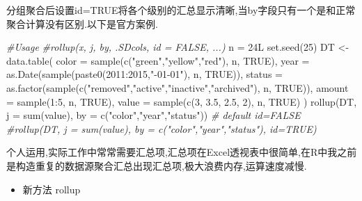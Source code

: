 \documentclass[
]{book}
\newenvironment{Shaded}{\begin{snugshade}}{\end{snugshade}}
\newcommand{\AttributeTok}[1]{\textcolor[rgb]{0.77,0.63,0.00}{#1}}
\newcommand{\CommentTok}[1]{\textcolor[rgb]{0.56,0.35,0.01}{\textit{#1}}}
\newcommand{\ConstantTok}[1]{\textcolor[rgb]{0.00,0.00,0.00}{#1}}
\newcommand{\DecValTok}[1]{\textcolor[rgb]{0.00,0.00,0.81}{#1}}
\newcommand{\FloatTok}[1]{\textcolor[rgb]{0.00,0.00,0.81}{#1}}
\newcommand{\FunctionTok}[1]{\textcolor[rgb]{0.00,0.00,0.00}{#1}}
\newcommand{\NormalTok}[1]{#1}
\newcommand{\OtherTok}[1]{\textcolor[rgb]{0.56,0.35,0.01}{#1}}
\newcommand{\SpecialCharTok}[1]{\textcolor[rgb]{0.00,0.00,0.00}{#1}}
\newcommand{\StringTok}[1]{\textcolor[rgb]{0.31,0.60,0.02}{#1}}
\providecommand{\tightlist}{%
  \setlength{\itemsep}{0pt}\setlength{\parskip}{0pt}}
\begin{document}
分组聚合后设置id=TRUE将各个级别的汇总显示清晰,当by字段只有一个是和正常聚合计算没有区别.以下是官方案例.

\begin{Shaded}
\begin{Highlighting}[]
\CommentTok{\#Usage}
\CommentTok{\#rollup(x, j, by, .SDcols, id = FALSE, ...)}
\NormalTok{n }\OtherTok{=}\NormalTok{ 24L}
\FunctionTok{set.seed}\NormalTok{(}\DecValTok{25}\NormalTok{)}
\NormalTok{DT }\OtherTok{\textless{}{-}} \FunctionTok{data.table}\NormalTok{(}
    \AttributeTok{color =} \FunctionTok{sample}\NormalTok{(}\FunctionTok{c}\NormalTok{(}\StringTok{"green"}\NormalTok{,}\StringTok{"yellow"}\NormalTok{,}\StringTok{"red"}\NormalTok{), n, }\ConstantTok{TRUE}\NormalTok{),}
    \AttributeTok{year =} \FunctionTok{as.Date}\NormalTok{(}\FunctionTok{sample}\NormalTok{(}\FunctionTok{paste0}\NormalTok{(}\DecValTok{2011}\SpecialCharTok{:}\DecValTok{2015}\NormalTok{,}\StringTok{"{-}01{-}01"}\NormalTok{), n, }\ConstantTok{TRUE}\NormalTok{)),}
    \AttributeTok{status =} \FunctionTok{as.factor}\NormalTok{(}\FunctionTok{sample}\NormalTok{(}\FunctionTok{c}\NormalTok{(}\StringTok{"removed"}\NormalTok{,}\StringTok{"active"}\NormalTok{,}\StringTok{"inactive"}\NormalTok{,}\StringTok{"archived"}\NormalTok{), n, }\ConstantTok{TRUE}\NormalTok{)),}
    \AttributeTok{amount =} \FunctionTok{sample}\NormalTok{(}\DecValTok{1}\SpecialCharTok{:}\DecValTok{5}\NormalTok{, n, }\ConstantTok{TRUE}\NormalTok{),}
    \AttributeTok{value =} \FunctionTok{sample}\NormalTok{(}\FunctionTok{c}\NormalTok{(}\DecValTok{3}\NormalTok{, }\FloatTok{3.5}\NormalTok{, }\FloatTok{2.5}\NormalTok{, }\DecValTok{2}\NormalTok{), n, }\ConstantTok{TRUE}\NormalTok{)}
\NormalTok{)}
\FunctionTok{rollup}\NormalTok{(DT, }\AttributeTok{j =} \FunctionTok{sum}\NormalTok{(value), }\AttributeTok{by =} \FunctionTok{c}\NormalTok{(}\StringTok{"color"}\NormalTok{,}\StringTok{"year"}\NormalTok{,}\StringTok{"status"}\NormalTok{)) }\CommentTok{\# default id=FALSE}
\CommentTok{\#rollup(DT, j = sum(value), by = c("color","year","status"), id=TRUE)}
\end{Highlighting}
\end{Shaded}

个人运用,实际工作中常常需要汇总项,汇总项在Excel透视表中很简单,在R中我之前是构造重复的数据源聚合汇总出现汇总项,极大浪费内存,运算速度减慢.

\begin{itemize}
\tightlist
\item
  新方法 rollup
\end{itemize}
\end{document}
